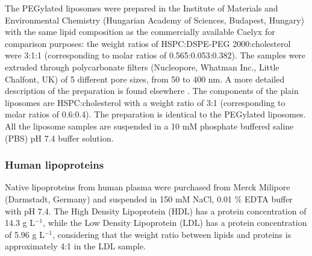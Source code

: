 The PEGylated liposomes were prepared in the Institute of Materials and Environmental Chemistry (Hungarian Academy of Sciences, Budapest, Hungary) with the same lipid composition as the commercially available Caelyx for comparison purposes: the weight ratios of HSPC:DSPE-PEG 2000:cholesterol were 3:1:1 (corresponding to molar ratios of 0.565:0.053:0.382). The samples were extruded through polycarbonate filters (Nucleopore, Whatman Inc., Little Chalfont, UK) of 5 different pore sizes, from 50 to 400 nm. A more detailed description of the preparation is found elsewhere \citep{varga_osmotic_2014}. The components of the plain liposomes are HSPC:cholesterol with a weight ratio of 3:1 (corresponding to molar ratios of 0.6:0.4). The preparation is identical to the PEGylated liposomes. All the liposome samples are suspended in a 10 mM phosphate buffered saline (PBS) pH 7.4 buffer solution.

\subsubsection{Human lipoproteins}

Native lipoproteins from human plasma were purchased from Merck Milipore (Darmstadt, Germany) and suspended in 150 mM NaCl, 0.01 $\%$ EDTA buffer with pH 7.4. The High Density Lipoprotein (HDL) has a protein concentration of 14.3 g L$^{-1}$, while the Low Density Lipoprotein (LDL) has a protein concentration of 5.96 g L$^{-1}$, considering that the weight ratio between lipids and proteins is approximately 4:1 in the LDL sample. 

%		


